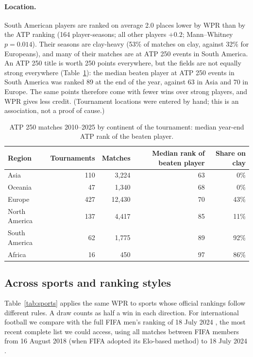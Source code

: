 \documentclass[11pt]{article}
\begin{document}
\paragraph{Location.} South American players are ranked on average 2.0 places lower by WPR than by the ATP ranking (164 player-seasons; all other players $+0.2$; Mann--Whitney $p = 0.014$). Their seasons are clay-heavy (53\% of matches on clay, against 32\% for Europeans), and many of their matches are at ATP 250 events in South America. An ATP 250 title is worth 250 points everywhere, but the fields are not equally strong everywhere (Table~\ref{tab:region}): the median beaten player at ATP 250 events in South America was ranked 89 at the end of the year, against 63 in Asia and 70 in Europe. The same points therefore come with fewer wins over strong players, and WPR gives less credit. (Tournament locations were entered by hand; this is an association, not a proof of cause.)

\begin{table}[h]
\centering
\caption{ATP 250 matches 2010--2025 by continent of the tournament: median year-end ATP rank of the beaten player.}
\label{tab:region}
\small
\begin{tabular}{lrrrr}
\toprule
Region & Tournaments & Matches & Median rank of beaten player & Share on clay \\
\midrule
Asia & 110 & 3,224 & 63 & 0\% \\
Oceania & 47 & 1,340 & 68 & 0\% \\
Europe & 427 & 12,430 & 70 & 43\% \\
North America & 137 & 4,417 & 85 & 11\% \\
South America & 62 & 1,775 & 89 & 92\% \\
Africa & 16 & 450 & 97 & 86\% \\
\bottomrule
\end{tabular}
\end{table}

\subsection{Across sports and ranking styles}
\label{sec:sports}
Table~\ref{tab:sports} applies the same WPR to sports whose official rankings follow different rules. A draw counts as half a win in each direction. For international football we compare with the full FIFA men's ranking of 18 July 2024 \citep{fifa2024}, the most recent complete list we could access, using all matches between FIFA members from 16 August 2018 (when FIFA adopted its Elo-based method) to 18 July 2024 \citep{intlresults}.
\end{document}
